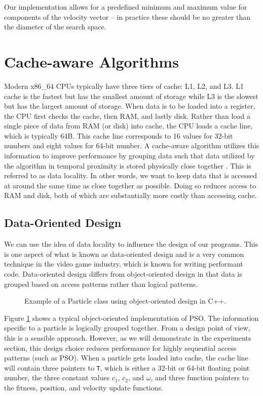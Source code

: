 Our implementation allows for a predefined minimum and maximum value for
components of the velocity vector -- in practice these should be no greater than
the diameter of the search space.


\section{Cache-aware Algorithms}\label{sec:cache}
Modern x86\_64 CPUs typically have three tiers of cache: L1, L2, and
L3. L1 cache is the fastest but has the smallest amount of storage while L3 is the
slowest but has the largest amount of storage.
When data is to be loaded into a register, the CPU first checks the
cache, then RAM, and lastly disk. Rather than load a single piece of data from
RAM (or disk) into cache, the CPU loads a cache line, which is typically
64B. This cache line corresponds to 16 values for 32-bit
numbers  and eight values for 64-bit number.
A cache-aware
algorithm utilizes this information to improve performance by grouping data such that data utilized by
the algorithm in temporal proximity is stored physically close together \cite{scientific-software}. This
is referred to as data locality. In other words, we want to keep data that is
accessed at around the same time as close together as possible. Doing so reduces
access to RAM and disk, both of which are substantially more
costly than accessing cache.

\subsection{Data-Oriented Design}
We can use the idea of data locality to
influence the design of our programs. This is one aspect of what is known as
data-oriented design\cite{dod} and
is a very common technique in the video game industry, which is known for
writing performant code.
Data-oriented design
differs from object-oriented design in that data is grouped based on access
patterns rather than logical patterns.

\begin{figure}
  
  \caption{Example of a Particle class using object-oriented
    design in C++.}\label{fig:particle}
\end{figure}

Figure \ref{fig:particle} shows a typical object-oriented implementation of PSO.
The information specific to a particle is logically grouped together. From a
design point of view, this is a sensible approach. However, as we will
demonstrate in the experiments section, this design choice reduces performance
for highly sequential access patterns (such as PSO).
When a particle gets loaded into cache, the
cache line will contain three pointers to \texttt{T}, which is either a
32-bit or 64-bit floating point number, the three constant values
$c_1$, $c_2$, and $\omega$, and three function pointers to the fitness,
position, and velocity update functions.

